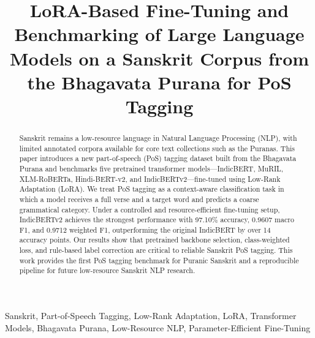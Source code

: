 \documentclass[conference]{IEEEtran}
\begin{document}
\title{LoRA-Based Fine-Tuning and Benchmarking of Large Language Models on a Sanskrit Corpus from the Bhagavata Purana for PoS Tagging\\}

\author{
\and
{}
}

\maketitle

\begin{abstract}
Sanskrit remains a low-resource language in Natural Language Processing (NLP), with limited annotated corpora available for core text collections such as the Puranas. This paper introduces a new part-of-speech (PoS) tagging dataset built from the Bhagavata Purana and benchmarks five pretrained transformer models---IndicBERT, MuRIL, XLM-RoBERTa, Hindi-BERT-v2, and IndicBERTv2---fine-tuned using Low-Rank Adaptation (LoRA). We treat PoS tagging as a context-aware classification task in which a model receives a full verse and a target word and predicts a coarse grammatical category. Under a controlled and resource-efficient fine-tuning setup, IndicBERTv2 achieves the strongest performance with 97.10\% accuracy, 0.9607 macro F1, and 0.9712 weighted F1, outperforming the original IndicBERT by over 14 accuracy points. Our results show that pretrained backbone selection, class-weighted loss, and rule-based label correction are critical to reliable Sanskrit PoS tagging. This work provides the first PoS tagging benchmark for Puranic Sanskrit and a reproducible pipeline for future low-resource Sanskrit NLP research.
\end{abstract}

\begin{IEEEkeywords}
Sanskrit, Part-of-Speech Tagging, Low-Rank Adaptation, LoRA, Transformer Models, Bhagavata Purana, Low-Resource NLP, Parameter-Efficient Fine-Tuning
\end{IEEEkeywords}
\end{document}
